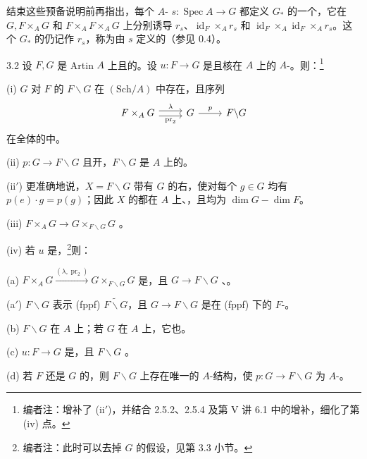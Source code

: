 结束这些预备说明前再指出，每个 $A$- $s:\operatorname{Spec}A\to G$ 都定义 $G_*$ 的一个，它在 $G,F\times_A G$
和 $F\times_A F\times_A G$ 上分别诱导 $r_s$、$\operatorname{id}_F\times_A r_s$ 和 $\operatorname{id}_F\times_A\operatorname{id}_F\times_A r_s$。这个 $G_*$ 的仍记作 $r_s$，称为由 $s$ 定义的（参见 0.4）。
\begin{SGAresult}{}{3.2}
设 $F,G$ 是 Artin  $A$ 上且的。设 $u:F\to G$ 是且核在 $A$ 上的 $A$-。则：\footnote{编者注：增补了 (ii$'$)，并结合 2.5.2、2.5.4 及第 V 讲 6.1 中的增补，细化了第 (iv) 点。}

(i) $G$ 对 $F$ 的 $F\backslash G$ 在 $(\mathrm{Sch}/A)$ 中存在，且序列
\[
\begin{tikzcd}
F\times_A G\arrow[r,shift left=.6ex,"\lambda"]\arrow[r,shift right=.6ex,"\operatorname{pr}_2"']&G\arrow[r,"p"]&F\backslash G
\end{tikzcd}
\]
在全体的中。

(ii)  $p:G\to F\backslash G$ 且开，$F\backslash G$ 是 $A$ 上的。

(ii$'$) 更准确地说，$X=F\backslash G$ 带有 $G$ 的右，使对每个 $g\in G$ 均有 $p(e)\cdot g=p(g)$；因此 $X$ 的都在 $A$ 上、，且均为 $\dim G-\dim F$。

(iii)  $F\times_A G\to G\times_{F\backslash G}G$ 。

(iv) 若 $u$ 是，\footnote{编者注：此时可以去掉 $G$ 的假设，见第 3.3 小节。}则：

(a) $F\times_A G\xrightarrow{(\lambda,\operatorname{pr}_2)}G\times_{F\backslash G}G$ 是，且 $G\to F\backslash G$ 、。

(a$'$) $F\backslash G$ 表示 (fppf)  $\widetilde{F\backslash G}$，且 $G\to F\backslash G$ 是在 (fppf) 下的 $F$-。

(b) $F\backslash G$ 在 $A$ 上；若 $G$ 在 $A$ 上，它也。

(c) $u:F\to G$ 是，且 $F\backslash G$ 。

(d) 若 $F$ 还是 $G$ 的，则 $F\backslash G$ 上存在唯一的 $A$-结构，使 $p:G\to F\backslash G$ 为 $A$-。
\end{SGAresult}
